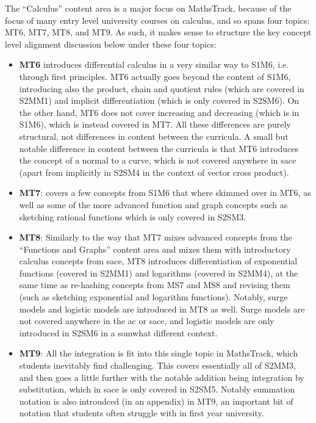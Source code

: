 \documentclass[twoside,12pt,a4paper]{report}
\begin{document}
The ``Calculus'' content area is a major focus on MathsTrack, because of the focus of many entry level university courses on calculus, and so spans four topics: MT6, MT7, MT8, and MT9. As such, it makes sense to structure the key concept level alignment discussion below under these four topics: 
\begin{itemize}
	\item \textbf{MT6} introduces differential calculus in a very similar way to S1M6, i.e. through first principles. MT6 actually goes beyond the content of S1M6, introducing also the product, chain and quotient rules (which are covered in S2MM1) and implicit differentiation (which is only covered in S2SM6). On the other hand, MT6 does not cover increasing and decreasing (which is in S1M6), which is instead covered in MT7. All these differences are purely structural, not differences in content between the curricula. A small but notable difference in content between the curricula is that MT6 introduces the concept of a normal to a curve, which is not covered anywhere in \gls{sace} (apart from implicitly in S2SM4 in the context of vector cross product).
	\item \textbf{MT7}: covers a few concepts from S1M6 that where skimmed over in MT6, as well as some of the more advanced function and graph concepts such as sketching rational functions which is only covered in S2SM3.
	\item \textbf{MT8}: Similarly to the way that MT7 mixes advanced concepts from the ``Functions and Graphs'' content area and mixes them with introductory calculus concepts from \gls{sace}, MT8 introduces differentiation of exponential functions (covered in S2MM1) and logarithms (covered in S2MM4), at the same time as re-hashing concepts from MS7 and MS8 and revising them (such as sketching exponential and logarithm functions).  Notably, surge models and logistic models are introduced in MT8 as well. Surge models are not covered anywhere in the \gls{ac} or \gls{sace}, and logistic models are only introduced in S2SM6 in a somwhat different context.
	\item \textbf{MT9}: All the integration is fit into this single topic in MathsTrack, which students inevitably find challenging. This covers essentially all of S2MM3, and then goes a little further with the notable addition being integration by substitution, which in \gls{sace} is only covered in S2SM5. Notably summation notation is also introudced (in an appendix) in MT9, an important bit of notation that students often struggle with in first year university.
\end{itemize}
\end{document}
